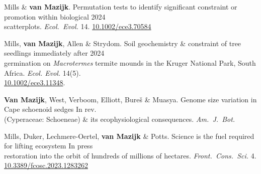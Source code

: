 

Mills \& \textbf{van Mazijk}.
Permutation tests to identify significant constraint or promotion within biological \hfill 2024 \\
\hspace{2em} scatterplots.
  \textit{Ecol.~Evol.}
  14. \href{http://dx.doi.org/10.1002/ece3.70584}{10.1002/ece3.70584}

Mills, \textbf{van Mazijk}, Allen \& Strydom.
Soil geochemistry \& constraint of tree seedlings immediately after
                                                              \hfill 2024 \\
\hspace{2em} germination on \textit{Macrotermes} termite
  mounds in the Kruger National Park, South Africa.
  \textit{Ecol. Evol.} 14(5). \\
  \hspace{2em} \href{http://dx.doi.org/10.1002/ece3.11348}{10.1002/ece3.11348}.

\textbf{Van Mazijk}, West, Verboom, Elliott, Bureš \& Muasya.
Genome size variation in Cape schoenoid sedges                \hfill In rev. \\
\hspace{2em} (Cyperaceae: Schoeneae) \& its ecophysiological consequences.
  \textit{Am.~J.~Bot.}

Mills, Duker, Lechmere-Oertel, \textbf{van Mazijk} \& Potts.
Science is the fuel required for lifting ecosystem             \hfill In press \\
\hspace{2em} restoration into the orbit of hundreds of millions of hectares.
  \textit{Front.~Cons.~Sci.}
  4. \\
  \hspace{2em} \href{https://doi.org/10.3389/fcosc.2023.1283262}{10.3389/fcosc.2023.1283262}

